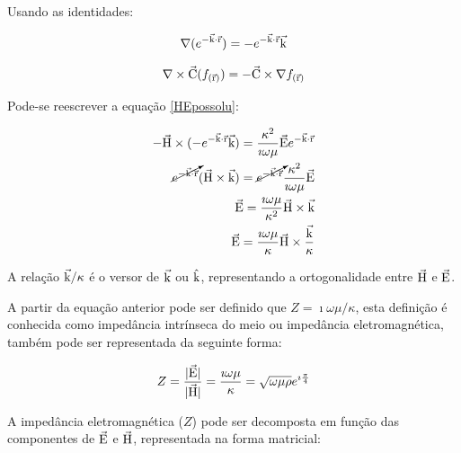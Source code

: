         \noindent Usando as identidades:
        
        \begin{equation}
            \nabla (e^{-\vec{\textrm{k}} \cdot \vec{\textrm{r}}}) = - e^{-\vec{\textrm{k}} \cdot \vec{\textrm{r}}} \vec{\textrm{k}}
        \end{equation}

        \begin{equation}
            \nabla \times \vec{\textrm{C}}(f_{(\vec{\textrm{r}})}) = - \vec{\textrm{C}} \times \nabla f_{(\vec{\textrm{r}})} 
        \end{equation}
        
        Pode-se reescrever a equação \ref{HEpossolu}:
        
        {\setlength\arraycolsep{2pt}
        \begin{eqnarray}
            \label{EZHvetor}
            - \vec{\textrm{H}} \times (- e^{-\vec{\textrm{k}} \cdot \vec{\textrm{r}}} \vec{\textrm{k}}) = \dfrac{\kappa^2}{\imath \omega \mu} \vec{\textrm{E}}e^{-\vec{\textrm{k}} \cdot \vec{\textrm{r}}} \nonumber \\
            \cancelto{}{e^{-\vec{\textrm{k}} \cdot \vec{\textrm{r}}}} (\vec{\textrm{H}} \times \vec{\textrm{k}}) = \cancelto{}{e^{-\vec{\textrm{k}} \cdot \vec{\textrm{r}}}} \dfrac{\kappa^2}{\imath \omega \mu} \vec{\textrm{E}}\nonumber \\
            \vec{\textrm{E}} = \dfrac{\imath \omega \mu}{\kappa^2} \vec{\textrm{H}} \times \vec{\textrm{k}} \nonumber \\
            \vec{\textrm{E}} = \dfrac{\imath \omega \mu}{\kappa} \vec{\textrm{H}} \times \dfrac{\vec{\textrm{k}}}{\kappa}
        \end{eqnarray}} 
        
        \noindent A relação $\vec{\textrm{k}}/\kappa$ é o versor de $\vec{\textrm{k}}$ ou  $\hat{\textrm{k}}$, representando a ortogonalidade entre $\vec{\textrm{H}}$ e $\vec{\textrm{E}}$.
        
        A partir da equação anterior pode ser definido que $Z = \imath \omega \mu / \kappa$, esta definição é conhecida como impedância intrínseca do meio ou impedância eletromagnética, também pode ser representada da seguinte forma:
        
        \begin{equation}
            Z = \dfrac{|\vec{\textrm{E}}|}{|\vec{\textrm{H}}|} = \dfrac{\imath \omega \mu}{\kappa} = \sqrt{\omega \mu \rho} e^{\imath \frac{\pi}{4}}
        \end{equation}
        
        A impedância eletromagnética ($Z$) pode ser decomposta em função das componentes de $\vec{\textrm{E}}$ e $\vec{\textrm{H}}$, representada na forma matricial:
        
